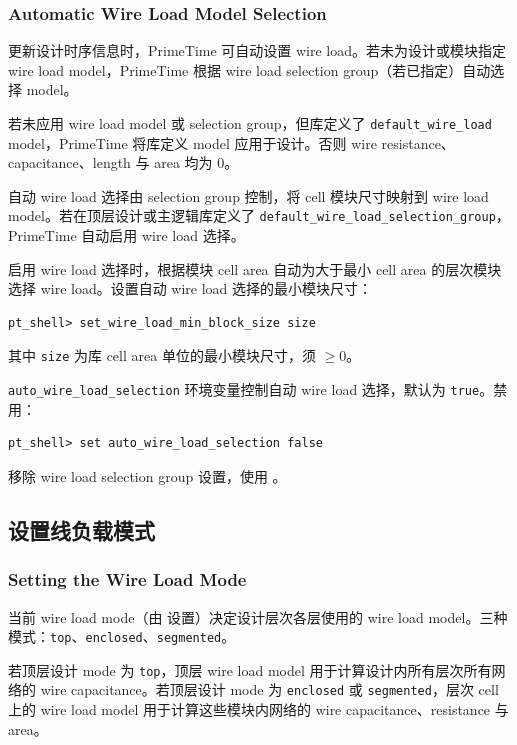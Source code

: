 \subsubsection*{Automatic Wire Load Model Selection}

更新设计时序信息时，PrimeTime 可自动设置 wire load。若未为设计或模块指定 wire load model，PrimeTime 根据 wire load selection group（若已指定）自动选择 model。

若未应用 wire load model 或 selection group，但库定义了 \texttt{default\_wire\_load} model，PrimeTime 将库定义 model 应用于设计。否则 wire resistance、capacitance、length 与 area 均为 0。

自动 wire load 选择由 selection group 控制，将 cell 模块尺寸映射到 wire load model。若在顶层设计或主逻辑库定义了 \texttt{default\_wire\_load\_selection\_group}，PrimeTime 自动启用 wire load 选择。

启用 wire load 选择时，根据模块 cell area 自动为大于最小 cell area 的层次模块选择 wire load。设置自动 wire load 选择的最小模块尺寸：
\begin{lstlisting}
pt_shell> set_wire_load_min_block_size size
\end{lstlisting}
其中 \texttt{size} 为库 cell area 单位的最小模块尺寸，须 $\geq 0$。

\texttt{auto\_wire\_load\_selection} 环境变量控制自动 wire load 选择，默认为 \texttt{true}。禁用：
\begin{lstlisting}
pt_shell> set auto_wire_load_selection false
\end{lstlisting}

移除 wire load selection group 设置，使用 。

\subsection{设置线负载模式}
\subsubsection*{Setting the Wire Load Mode}

当前 wire load mode（由  设置）决定设计层次各层使用的 wire load model。三种模式：\texttt{top}、\texttt{enclosed}、\texttt{segmented}。

若顶层设计 mode 为 \texttt{top}，顶层 wire load model 用于计算设计内所有层次所有网络的 wire capacitance。若顶层设计 mode 为 \texttt{enclosed} 或 \texttt{segmented}，层次 cell 上的 wire load model 用于计算这些模块内网络的 wire capacitance、resistance 与 area。


